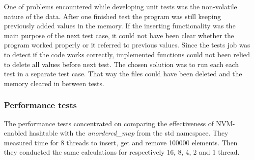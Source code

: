         One of problems encountered while developing unit tests was the non-volatile nature of the data. After one finished test the program was still keeping previously added values in the memory. If the inserting functionality was the main purpose of the next test case, it could not have been clear whether the program worked properly or it referred to previous values. Since the tests job was to detect if the code works correctly, implemented functions could not been relied to delete all values before next test. The chosen solution was to run each each test in a separate test case. That way the files could have been deleted and the memory cleared in between tests.


    \subsubsection{Performance tests}
        The performance tests concentrated on comparing the effectiveness of NVM-enabled hashtable with the \textit{unordered\_map} from the std namespace. They measured time for 8 threads to insert, get and remove 100000 elements. Then they conducted the same calculations for respectively 16, 8, 4, 2 and 1 thread. 
    
